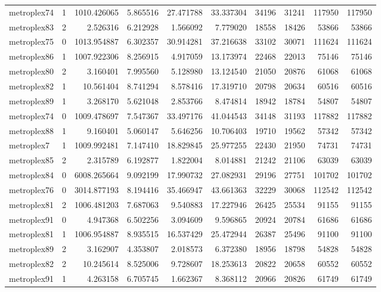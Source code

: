 \begin{longtable}{|l|r|r|r|r|r|r|r|r|r|}
metroplex74 & 1 & 1010.426065 & 5.865516 & 27.471788 & 33.337304 & 34196 & 31241 & 117950 & 117950 \\
metroplex83 & 2 & 2.526316 & 6.212928 & 1.566092 & 7.779020 & 18558 & 18426 & 53866 & 53866 \\
metroplex75 & 0 & 1013.954887 & 6.302357 & 30.914281 & 37.216638 & 33102 & 30071 & 111624 & 111624 \\
metroplex86 & 1 & 1007.922306 & 8.256915 & 4.917059 & 13.173974 & 22468 & 22013 & 75146 & 75146 \\
metroplex80 & 2 & 3.160401 & 7.995560 & 5.128980 & 13.124540 & 21050 & 20876 & 61068 & 61068 \\
metroplex82 & 1 & 10.561404 & 8.741294 & 8.578416 & 17.319710 & 20798 & 20634 & 60516 & 60516 \\
metroplex89 & 1 & 3.268170 & 5.621048 & 2.853766 & 8.474814 & 18942 & 18784 & 54807 & 54807 \\
metroplex74 & 0 & 1009.478697 & 7.547367 & 33.497176 & 41.044543 & 34148 & 31193 & 117882 & 117882 \\
metroplex88 & 1 & 9.160401 & 5.060147 & 5.646256 & 10.706403 & 19710 & 19562 & 57342 & 57342 \\
metroplex7 & 1 & 1009.992481 & 7.147410 & 18.829845 & 25.977255 & 22430 & 21950 & 74731 & 74731 \\
metroplex85 & 2 & 2.315789 & 6.192877 & 1.822004 & 8.014881 & 21242 & 21106 & 63039 & 63039 \\
metroplex84 & 0 & 6008.265664 & 9.092199 & 17.990732 & 27.082931 & 29196 & 27751 & 101702 & 101702 \\
metroplex76 & 0 & 3014.877193 & 8.194416 & 35.466947 & 43.661363 & 32229 & 30068 & 112542 & 112542 \\
metroplex81 & 2 & 1006.481203 & 7.687063 & 9.540883 & 17.227946 & 26425 & 25534 & 91155 & 91155 \\
metroplex91 & 0 & 4.947368 & 6.502256 & 3.094609 & 9.596865 & 20924 & 20784 & 61686 & 61686 \\
metroplex81 & 1 & 1006.954887 & 8.935515 & 16.537429 & 25.472944 & 26387 & 25496 & 91100 & 91100 \\
metroplex89 & 2 & 3.162907 & 4.353807 & 2.018573 & 6.372380 & 18956 & 18798 & 54828 & 54828 \\
metroplex82 & 2 & 10.245614 & 8.525006 & 9.728607 & 18.253613 & 20822 & 20658 & 60552 & 60552 \\
metroplex91 & 1 & 4.263158 & 6.705745 & 1.662367 & 8.368112 & 20966 & 20826 & 61749 & 61749 \\

\end{longtable}
